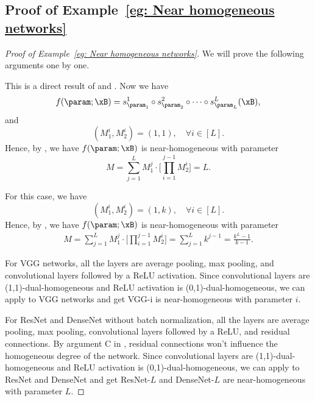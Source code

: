 \subsection{Proof of Example~\ref{eg: Near homogeneous networks}}
\begin{proof}[Proof of Example~\ref{eg: Near homogeneous networks}]
We will prove the following arguments one by one.


This is a direct result of  and . Now we have 
\[
    f(\param;\xB) = s^1_{\param_1} \circ s^2_{\param_2} \circ \cdots \circ s^L_{\param_L}(\xB),
\]
and 
\[
(M_{1}^i, M_{2}^i) = (1,1), \quad \forall i \in [L].
\]
Hence, by , we have $f(\param;\xB)$ is near-homogeneous with parameter 
\[
M = \sum_{j=1}^L M_1^j \cdot \bigg [  \prod_{i=1}^{j-1} M^i_2 \bigg] = L.
\]


For this case, we have 
\[
(M_{1}^i, M_{2}^i) = (1,k), \quad \forall i \in [L].
\]
Hence, by , we have $f(\param;\xB)$ is near-homogeneous with parameter 
\begin{align*}
M = \sum_{j=1}^L M_1^j \cdot \bigg [  \prod_{i=1}^{j-1} M^i_2 \bigg]
=  \sum_{j=1}^L k^{j-1} 
= \frac{k^L-1}{k-1}. 
\end{align*}


For VGG networks, all the layers are average pooling, max pooling, and convolutional layers followed by a ReLU activation. Since convolutional layers are (1,1)-dual-homogeneous and ReLU activation is (0,1)-dual-homogeneous, we can apply  to VGG networks and get VGG-i is near-homogeneous with parameter $i$.


For ResNet and DenseNet without batch normalization, all the layers are average pooling, max pooling, convolutional layers followed by a ReLU, and residual connections. 
By argument C in , residual connections won't influence the homogeneous degree of the network. 
Since convolutional layers are (1,1)-dual-homogeneous and ReLU activation is (0,1)-dual-homogeneous, we can apply  to ResNet and DenseNet and get ResNet-$L$ and DenseNet-$L$ are near-homogeneous with parameter $L$.
\end{proof}

